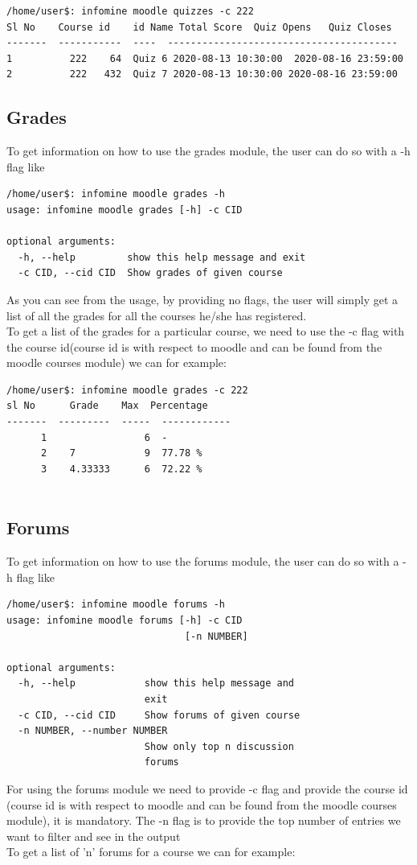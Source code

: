 \documentclass[12pt, letterpaper, twoside]{article}
\begin{document}
\begin{verbatim}
/home/user$: infomine moodle quizzes -c 222
Sl No    Course id    id Name Total Score  Quiz Opens   Quiz Closes
-------  -----------  ----  ----------------------------------------
1          222    64  Quiz 6 2020-08-13 10:30:00  2020-08-16 23:59:00
2          222   432  Quiz 7 2020-08-13 10:30:00 2020-08-16 23:59:00
\end{verbatim}

\subsection{Grades}
To get information on how to use the grades module, the user can do so with a -h flag like 
\begin{verbatim}
/home/user$: infomine moodle grades -h
usage: infomine moodle grades [-h] -c CID

optional arguments:
  -h, --help         show this help message and exit
  -c CID, --cid CID  Show grades of given course
\end{verbatim}
As you can see from the usage, by providing no flags, the user will simply get a list of all the grades for all the courses he/she has registered.\\
To get a list of the grades for a particular course, we need to use the -c flag with the course id(course id is with respect to moodle and can be found from the moodle courses module) we can for example:

\begin{verbatim}
/home/user$: infomine moodle grades -c 222
sl No      Grade    Max  Percentage
-------  ---------  -----  ------------
      1                 6  -
      2    7            9  77.78 %
      3    4.33333      6  72.22 %
    
\end{verbatim}

\subsection{Forums}
To get information on how to use the forums module, the user can do so with a -h flag like 
\begin{verbatim}
/home/user$: infomine moodle forums -h
usage: infomine moodle forums [-h] -c CID
                               [-n NUMBER]

optional arguments:
  -h, --help            show this help message and
                        exit
  -c CID, --cid CID     Show forums of given course
  -n NUMBER, --number NUMBER
                        Show only top n discussion
                        forums
\end{verbatim}
For using the forums module we need to provide -c flag and provide the course id (course id is with respect to moodle and can be found from the moodle courses module), it is mandatory. The -n flag is to provide the top number of entries we want to filter and see in the output\\
To get a list of 'n' forums for a course we can for example:
\end{document}
